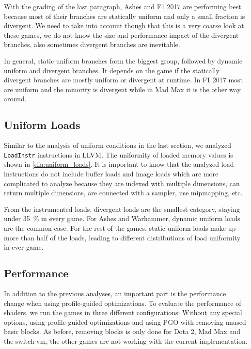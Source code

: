 With the grading of the last paragraph, Ashes and F1 2017 are performing best because most of their branches are statically uniform and only a small fraction is divergent.
We need to take into account though that this is a very coarse look at these games, we do not know the size and performance impact of the divergent branches, also sometimes divergent branches are inevitable.

In general, static uniform branches form the biggest group, followed by dynamic uniform and divergent branches.
It depends on the game if the statically divergent branches are mostly uniform or divergent at runtime.
In F1 2017 most are uniform and the minority is divergent while in Mad Max it is the other way around.

\subsection{Uniform Loads}
\label{sub:eval_uniform_loads}
Similar to the analysis of uniform conditions in the last section, we analyzed \texttt{LoadInstr} instructions in LLVM.
The uniformity of loaded memory values is shown in \cref{dia:uniform_loads}.
It is important to know that the analyzed load instructions do not include buffer loads and image loads which are more complicated to analyze because they are indexed with multiple dimensions, can return multiple dimensions, are connected with a sampler, use mipmapping, etc.


From the instrumented loads, divergent loads are the smallest category, staying under \SI{35}{\percent} in every game.
For Ashes and Warhammer, dynamic uniform loads are the common case. For the rest of the games, static uniform loads make up more than half of the loads, leading to different distributions of load uniformity in ever game.

\subsection{Performance}
\label{sub:eval_perf}
In addition to the previous analyses, an important part is the performance change when using profile-guided optimizations.
To evaluate the performance of shaders, we run the games in three different configurations: Without any special options, using profile-guided optimizations and using PGO with removing unused basic blocks.
As before, removing blocks is only done for Dota 2, Mad Max and the switch vm, the other games are not working with the current implementation.


